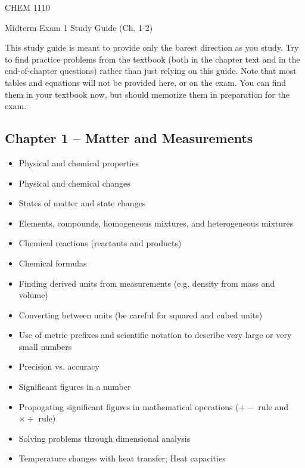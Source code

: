 \documentclass[12pt, letterpaper]{memoir}
\begin{document}
	\mainmatter
	
	\begin{center}
		{\Huge CHEM 1110}
		
		{\LARGE Midterm Exam 1 Study Guide (Ch. 1-2)}
	\end{center}
	
	This study guide is meant to provide only the barest direction as you study. Try to find practice problems from the textbook (both in the chapter text and in the end-of-chapter questions) rather than just relying on this guide. Note that most tables and equations will not be provided here, or on the exam. You can find them in your textbook now, but should memorize them in preparation for the exam.
	

	\subsection*{Chapter 1 -- Matter and Measurements}
	\begin{itemize}
		\item Physical and chemical properties
		\item Physical and chemical changes
		\item States of matter and state changes
		\item Elements, compounds, homogeneous mixtures, and heterogeneous mixtures
		\item Chemical reactions (reactants and products)
		\item Chemical formulas
		\item Finding derived units from measurements (e.g. density from mass and volume)
		\item Converting between units (be careful for squared and cubed units)
		\item Use of metric prefixes and scientific notation to describe very large or very small numbers
		\item Precision vs. accuracy
		\item Significant figures in a number
		\item Propogating significant figures in mathematical operations ($+-$ rule and $\times \div$ rule)
		\item Solving problems through dimensional analysis
		\item Temperature changes with heat transfer; Heat capacities
	\end{itemize}
\end{document}
